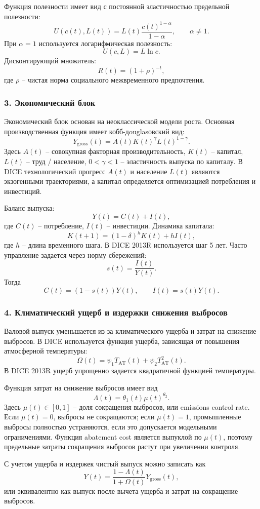 \documentclass[12pt,a4paper]{article}
\begin{document}
Функция полезности имеет вид с постоянной эластичностью предельной полезности:
\[
U(c(t),L(t))=L(t)\frac{c(t)^{1-\alpha}}{1-\alpha},\qquad \alpha\ne 1.
\]
При $\alpha=1$ используется логарифмическая полезность:
\[
U(c,L)=L\ln c.
\]
Дисконтирующий множитель:
\[
R(t)=(1+\rho)^{-t},
\]
где $\rho$ -- чистая норма социального межвременного предпочтения.

\subsubsection*{3. Экономический блок}
Экономический блок основан на неоклассической модели роста. Основная производственная функция имеет кобб-дouglasовский вид:
\[
Y_{\mathrm{gross}}(t)=A(t)K(t)^\gamma L(t)^{1-\gamma}.
\]
Здесь $A(t)$ -- совокупная факторная производительность, $K(t)$ -- капитал, $L(t)$ -- труд / население, $0<\gamma<1$ -- эластичность выпуска по капиталу. В DICE технологический прогресс $A(t)$ и население $L(t)$ являются экзогенными траекториями, а капитал определяется оптимизацией потребления и инвестиций.

Баланс выпуска:
\[
Y(t)=C(t)+I(t),
\]
где $C(t)$ -- потребление, $I(t)$ -- инвестиции. Динамика капитала:
\[
K(t+1)=(1-\delta)^hK(t)+hI(t),
\]
где $h$ -- длина временного шага. В DICE 2013R используется шаг 5 лет. Часто управление задается через норму сбережений:
\[
s(t)=\frac{I(t)}{Y(t)}.
\]
Тогда
\[
C(t)=(1-s(t))Y(t),\qquad I(t)=s(t)Y(t).
\]

\subsubsection*{4. Климатический ущерб и издержки снижения выбросов}
Валовой выпуск уменьшается из-за климатического ущерба и затрат на снижение выбросов. В DICE используется функция ущерба, зависящая от повышения атмосферной температуры:
\[
\Omega(t)=\psi_1T_{\mathrm{AT}}(t)+\psi_2T_{\mathrm{AT}}^2(t).
\]
В DICE 2013R ущерб упрощенно задается квадратичной функцией температуры.

Функция затрат на снижение выбросов имеет вид
\[
\Lambda(t)=\theta_1(t)\mu(t)^{\theta_2}.
\]
Здесь $\mu(t)\in[0,1]$ -- доля сокращения выбросов, или emissions control rate. Если $\mu(t)=0$, выбросы не сокращаются; если $\mu(t)=1$, промышленные выбросы полностью устраняются, если это допускается модельными ограничениями. Функция abatement cost является выпуклой по $\mu(t)$, поэтому предельные затраты сокращения выбросов растут при увеличении контроля.

С учетом ущерба и издержек чистый выпуск можно записать как
\[
Y(t)=\frac{1-\Lambda(t)}{1+\Omega(t)}Y_{\mathrm{gross}}(t),
\]
или эквивалентно как выпуск после вычета ущерба и затрат на сокращение выбросов.
\end{document}
